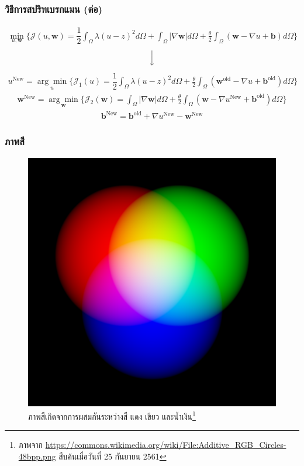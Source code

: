\documentclass[xcolor=dvipsnames, xetex,serif]{beamer}
\numberwithin{equation}{section}
\begin{document}
		\begin{frame}
			\frametitle{วิธีการสปริทเบรกแมน (ต่อ)}
				\begin{align*}
			\min_{u,\boldsymbol{w}} \{ \mathcal{J}(u,\boldsymbol{w}) = \dfrac{1}{2} \int_{\Omega} \lambda(u-z)^2 d\Omega +  \int_{\Omega}  |\nabla \boldsymbol{w}|  d\Omega + \frac{\theta}{2} \int_{\Omega} (\boldsymbol{w} - \nabla u + \boldsymbol{b}) d\Omega \}
			\end{align*}
			$$ \Big \downarrow$$
			\begin{align*}
			u^{\text{New}}=\underset{u}{\arg\min} \{ \mathcal{J}_1(u) = \dfrac{1}{2} \int_{\Omega} \lambda(u-z)^2 d\Omega + \frac{\theta}{2} \int_{\Omega} (\boldsymbol{w}^{\text{old}} - \nabla u + \boldsymbol{b}^{\text{old}}) d\Omega \}
			\end{align*}
			\begin{align*}
			\boldsymbol{w}^{\text{New}}=\underset{\boldsymbol{w}}{\arg\min} \{ \mathcal{J}_2(\boldsymbol{w}) = \int_{\Omega}  |\nabla \boldsymbol{w}|  d\Omega  + \frac{\theta}{2} \int_{\Omega} (\boldsymbol{w} - \nabla u^{\text{New}} + \boldsymbol{b}^{\text{old}}) d\Omega \}
			\end{align*}
			\begin{align*}
			\boldsymbol{b}^{\text{New}}=\boldsymbol{b}^{\text{old}}+\nabla u^{\text{New}}-\boldsymbol{w}^{\text{New}}
			\end{align*}
		\end{frame}  
		\begin{frame}
			\frametitle{ภาพสี}
			\begin{figure}[H]
				\centering
				\includegraphics[width=0.4\linewidth]{images/rgb-space.png}
				\caption{ภาพสีเกิดจากการผสมกันระหว่างสี แดง เขียว และน้ำเงิน\footnote{\tiny{ภาพจาก \url{https://commons.wikimedia.org/wiki/File:Additive_RGB_Circles-48bpp.png}  สืบค้นเมื่อวันที่ 25 กันยายน 2561}}}
				\label{image:rgb-space}
			\end{figure}
		\end{frame}
\end{document}
